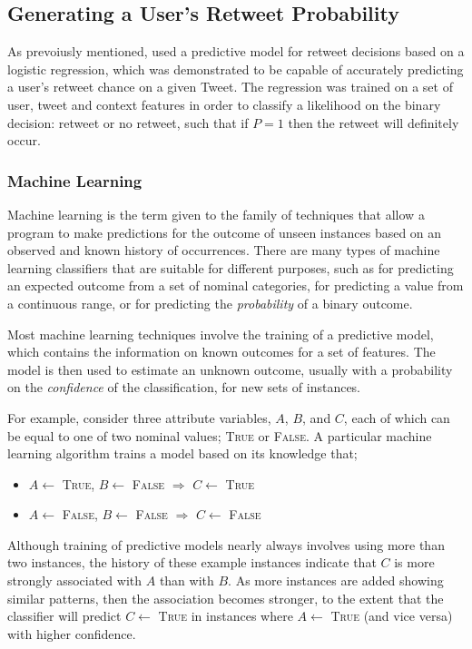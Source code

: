 \subsection{Generating a User's Retweet Probability} 
As prevoiusly mentioned, \cite{zhu11} used a predictive model for retweet decisions based on a logistic regression, which was demonstrated to be capable of accurately predicting a user's retweet chance on a given Tweet. The regression was trained on a set of user, tweet and context features in order to classify a likelihood on the binary decision: retweet or no retweet, such that if $P = 1$ then the retweet will definitely occur.


\subsubsection{Machine Learning}
Machine learning is the term given to the family of techniques that allow a program to make predictions for the outcome of unseen instances based on an observed and known history of occurrences. There are many types of machine learning classifiers that are suitable for different purposes, such as for predicting an expected outcome from a set of nominal categories, for predicting a value from a continuous range, or for predicting the \textit{probability} of a binary outcome.

Most machine learning techniques involve the training of a predictive model, which contains the information on known outcomes for a set of features. The model is then used to estimate an unknown outcome, usually with a probability on the \textit{confidence} of the classification, for new sets of instances.

For example, consider three attribute variables, $A$, $B$, and $C$, each of which can be equal to one of two nominal values; \textsc{True} or \textsc{False}. A particular machine learning algorithm trains a model based on its knowledge that;
\begin{itemize}
    \item $A\gets$ \textsc{True}, $B\gets$ \textsc{False} $\Longrightarrow$ $C\gets$ \textsc{True}
    \item $A\gets$ \textsc{False}, $B\gets$ \textsc{False} $\Longrightarrow$ $C\gets$ \textsc{False}
\end{itemize}
Although training of predictive models nearly always involves using more than two instances, the history of these example instances indicate that $C$ is more strongly associated with $A$ than with $B$. As more instances are added showing similar patterns, then the association becomes stronger, to the extent that the classifier will predict $C\gets$ \textsc{True} in instances where $A\gets$ \textsc{True} (and vice versa) with higher confidence.

